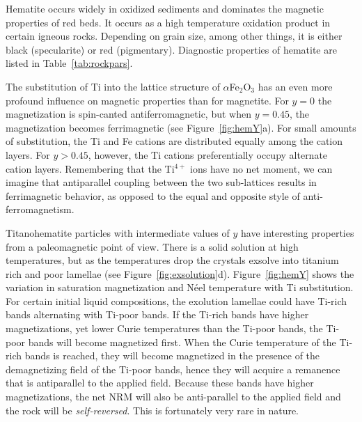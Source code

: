 Hematite occurs widely in oxidized sediments and dominates the magnetic
properties of red beds.  It occurs as a high temperature oxidation product 
in certain igneous rocks.  Depending on grain size, among
other things, it is either
black (specularite) or red (pigmentary).  Diagnostic properties of hematite are listed in Table~\ref{tab:rockpars}.



The substitution of Ti into the lattice structure of $\alpha$Fe$_2$O$_3$ has an even more profound influence on magnetic properties  than for magnetite.  For $y=0$ the magnetization is spin-canted antiferromagnetic, but when $y=0.45$, the magnetization becomes ferrimagnetic (see Figure~\ref{fig:hemY}a).   For small amounts of substitution, the Ti and Fe cations are distributed equally among the cation layers.  For $y>0.45$, however, the Ti cations preferentially occupy alternate cation layers.  Remembering that the Ti$^{4+}$  ions have no net moment, we can imagine  that antiparallel coupling between the two sub-lattices results in ferrimagnetic behavior, as opposed to the equal and opposite style of anti-ferromagnetism.  



Titanohematite particles with intermediate values of $y$ have interesting properties from a paleomagnetic point of view.   There is a solid solution at high temperatures, but as the temperatures drop the crystals exsolve into titanium rich  and poor  lamellae (see Figure~\ref{fig:exsolution}d).  Figure~\ref{fig:hemY} shows the variation in saturation magnetization and N\'eel  temperature with Ti substitution.   For certain initial liquid compositions, the exolution lamellae could have Ti-rich bands alternating with Ti-poor bands.  If the Ti-rich bands have higher magnetizations, yet lower Curie temperatures than the Ti-poor bands, the Ti-poor bands will become magnetized first.  When the Curie temperature of the Ti-rich bands is reached, they will become magnetized in the presence of the demagnetizing field of the Ti-poor bands, hence they will acquire a remanence that is antiparallel to the applied field.  Because these bands have higher magnetizations, the net NRM will also be anti-parallel to the applied field and the rock will be {\it self-reversed}.   This is fortunately very rare in nature.


